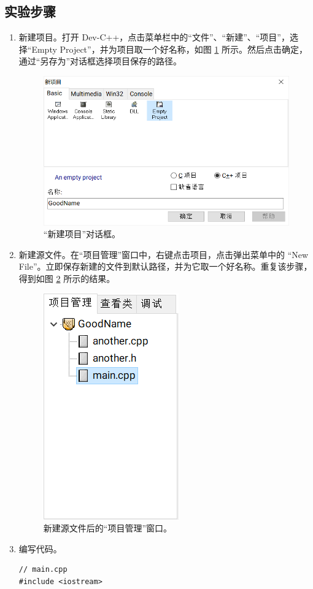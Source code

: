 \subsection*{实验步骤}

\begin{enumerate}
	\item 新建项目。打开 Dev-C++，点击菜单栏中的“文件”、“新建”、“项目”，选择“Empty Project”，并为项目取一个好名称，如图 \ref{fig:multi-source-1} 所示。然后点击确定，通过“另存为”对话框选择项目保存的路径。

	\begin{figure}
		\centering
		\includegraphics[width=0.75\linewidth]{assets/multi-source-1}
		\caption{“新建项目”对话框。}
		\label{fig:multi-source-1}
	\end{figure}

	\item 新建源文件。在“项目管理”窗口中，右键点击项目，点击弹出菜单中的 “New File”。立即保存新建的文件到默认路径，并为它取一个好名称。重复该步骤，得到如图 \ref{fig:multi-source-2} 所示的结果。

	\begin{figure}
		\centering
		\includegraphics[width=0.2\linewidth]{assets/multi-source-2}
		\caption{新建源文件后的“项目管理”窗口。}
		\label{fig:multi-source-2}
	\end{figure}

	\item 编写代码。

	\begin{lstlisting}[language={[17]C++}, moreemph={[2]another}]
// main.cpp
#include <iostream>


\end{lstlisting}
\end{enumerate}
